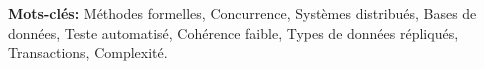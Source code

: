 %
%

\medskip
\noindent
\textbf{Mots-clés:} Méthodes formelles, Concurrence, Systèmes distribués, Bases de données, Teste automatisé, Cohérence faible, Types de données répliqués, Transactions, Complexité.
